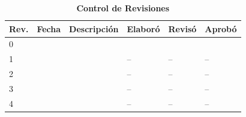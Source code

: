 \begin{table}[H]
	\centering
	\caption*{\textbf{Control de Revisiones}}
	\label{tab:control_revisiones}
	\renewcommand{\arraystretch}{1.3}
	\begin{tabularx}{\textwidth}{@{}llXlll@{}}
		\toprule[1.5pt]
		\textbf{Rev.} & \textbf{Fecha} & \textbf{Descripci\'on} & \textbf{Elabor\'o} & \textbf{Revis\'o} & \textbf{Aprob\'o} \\
		\midrule
		0 & \fechaRevCero & \descRevCero & \firmaElaboro & \firmaReviso & \firmaAprobo \\
		1 & \fechaRevUno & \descRevUno & -- & -- & -- \\
		2 & \fechaRevDos & \descRevDos & -- & -- & -- \\
		3 & \fechaRevTres & \descRevTres & -- & -- & -- \\
		4 & \fechaRevCuatro & \descRevCuatro & -- & -- & -- \\
		\bottomrule[1.5pt]
	\end{tabularx}
\end{table}
\endgroup

\newpage
